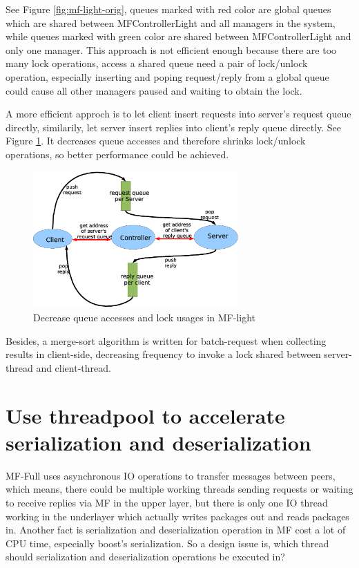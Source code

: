 \documentclass[a4paper,10pt]{article}
\begin{document}
See Figure \ref{fig:mf-light-orig}, queues marked with red color are global queues which are shared between MFControllerLight and all managers in the system,
while queues marked with green color are shared between MFControllerLight and only one manager. This approach is not efficient enough because there are too many
lock operations, access a shared queue need a pair of lock/unlock operation, especially inserting and poping request/reply from a global queue could cause all other managers
paused and waiting to obtain the lock.


A more efficient approch is to let client insert requests into server's request queue directly, similarily, let server insert replies into client's reply queue directly. See Figure \ref{fig:mf-light-now}.
It decreases queue accesses and therefore shrinks lock/unlock operations, so better performance could be achieved.

\begin{figure}[!ht]\centering
  \includegraphics[width=0.7\textwidth]{mf-light-now.eps}
  \caption{ Decrease queue accesses and lock usages in MF-light}\label{fig:mf-light-now}
\end{figure}

Besides, a merge-sort algorithm is written for batch-request when collecting results in client-side, decreasing frequency to invoke a lock shared between server-thread and client-thread.

\section{Use threadpool to accelerate serialization and deserialization}
MF-Full uses asynchronous IO operations to transfer messages between peers, 
which means, there could be multiple working threads sending requests or waiting to receive replies via MF in the upper layer,
but there is only one IO thread working in the underlayer which actually writes packages out and reads packages in.
Another fact is serialization and deserialization operation in MF cost a lot of CPU time, especially boost's serialization.
So a design issue is, which thread should serialization and deserialization operations be executed in?
\end{document}
